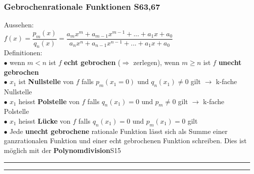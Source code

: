 \subsubsection{Gebrochenrationale Funktionen \color{red}S63,67}
Aussehen:\\
\qquad $f(x)=\dfrac{p_{m}(x)}{q_{n}(x)}=\dfrac{a_{m}x^{m}+a_{m-1}x^{m-1}+...+a_{1}x+a_{0}}{a_{n}x^{n}+a_{n-1}x^{n-1}+...+a_{1}x+a_{0}}$\\
Definitionen:\\
$\bullet$ wenn $m<n$ ist $f$ \textbf{echt gebrochen} ($ \Rightarrow $ zerlegen), wenn $m\geq n$ ist $f$ \textbf{unecht gebrochen}\\
$\bullet$ $x_{1}$ ist \textbf{Nullstelle} von $f$ falls $p_{m}(x_{1}=0)$ und $q_{n}(x_{1}) \neq 0$ gilt $ \longrightarrow $ k-fache Nullstelle\\
$\bullet$ $x_{1}$ heisst \textbf{Polstelle} von $f$ falls $q_{n}(x_{1})=0$ und $p_{m} \neq 0$ gilt $ \longrightarrow $ k-fache Polstelle\\
$\bullet$ $x_{1}$ heisst \textbf{Lücke} von $f$ falls $q_{n}(x_{1})=0$ und $p_{m}(x_{1})=0$ gilt\\
$\bullet$ Jede \textbf{unecht gebrochene} rationale Funktion lässt sich als Summe einer ganzrationalen Funktion und einer echt gebrochenen Funktion schreiben. Dies ist möglich mit der \textbf{Polynomdivision}\color{red}S15\color{black}\\
\hrule
\hrule
